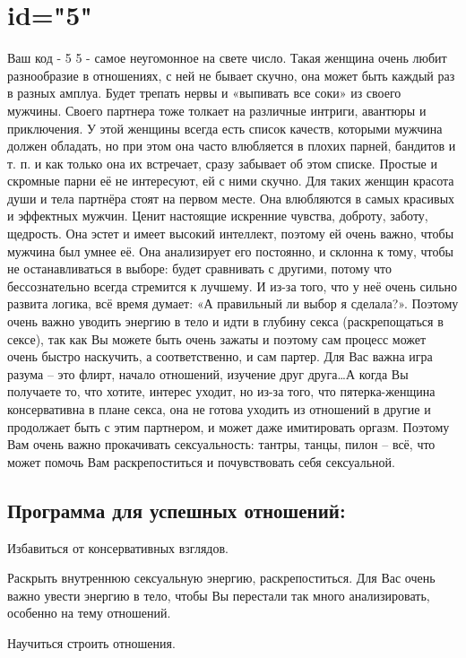\section{id="5"}{Ваш код - 5}
5 - самое неугомонное на свете число. Такая женщина очень любит 
разнообразие в отношениях, с ней не бывает скучно, она может быть 
каждый раз в разных амплуа. Будет трепать нервы и «выпивать все соки» 
из своего мужчины. Своего партнера тоже толкает на различные интриги, 
авантюры и приключения. У этой женщины всегда есть список качеств, 
которыми мужчина должен обладать, но при этом она часто влюбляется в 
плохих парней, бандитов и т. п. и как только она их встречает, сразу 
забывает об этом списке. Простые и скромные парни её не интересуют, 
ей с ними скучно. Для таких женщин красота души и тела партнёра стоят 
на первом месте. Она влюбляются в самых красивых и эффектных мужчин. 
Ценит настоящие искренние чувства, доброту, заботу, щедрость. Она 
эстет и имеет высокий интеллект, поэтому ей очень важно, чтобы 
мужчина был умнее её. Она анализирует его постоянно, и склонна к тому, 
чтобы не останавливаться в выборе: будет сравнивать с другими, потому 
что бессознательно всегда стремится к лучшему. И из-за того, что у 
неё очень сильно развита логика, всё время думает: «А правильный ли 
выбор я сделала?». Поэтому очень важно уводить энергию в тело и идти 
в глубину секса (раскрепощаться в сексе), так как Вы можете быть очень 
зажаты и поэтому сам процесс может очень быстро наскучить, а 
соответственно, и сам партер. Для Вас важна игра разума – это флирт, 
начало отношений, изучение друг друга…А когда Вы получаете то, что 
хотите, интерес уходит, но из-за того, что пятерка-женщина консервативна 
в плане секса, она не готова уходить из отношений в другие и продолжает 
быть с этим партнером, и может даже имитировать оргазм. Поэтому Вам 
очень важно прокачивать сексуальность: тантры, танцы, пилон – всё, 
что может помочь Вам раскрепоститься и почувствовать себя сексуальной.
\subsection{Программа для успешных отношений:}
\item Избавиться от консервативных взглядов.
\item Раскрыть внутреннюю сексуальную энергию, раскрепоститься. Для 
Вас очень важно увести энергию в тело, чтобы Вы перестали так много 
анализировать, особенно на тему отношений.
\item Научиться строить отношения.
\endsubsection
\endsection

